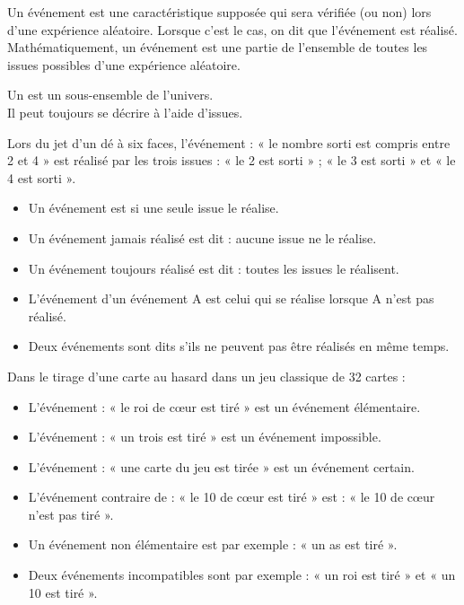 Un événement est une caractéristique supposée qui sera vérifiée (ou non) lors d'une expérience aléatoire. Lorsque c'est le cas, on dit que l'événement est réalisé. \\
Mathématiquement, un événement est une partie de l'ensemble de toutes les issues possibles d'une expérience aléatoire.

\begin{definition}[Événement]
Un  est un sous-ensemble de l'univers.\\
Il peut toujours se décrire à l'aide d'issues.  
\end{definition}

\begin{exemple*1}
Lors du jet d'un dé à six faces, l'événement : « le nombre sorti est compris entre 2 et 4 » est réalisé par les trois issues : « le 2 est sorti » ; « le 3 est sorti » et « le 4 est sorti ».
\end{exemple*1}


\begin{definition}
\begin{itemize}
\item Un événement est  si une seule issue le réalise.
\item Un événement jamais réalisé est dit  : aucune issue ne le réalise.
\item Un événement toujours réalisé est dit  : toutes les issues le réalisent.
\item L'événement  d'un événement A est celui qui se réalise lorsque A n'est pas réalisé.
\item Deux événements sont dits  s'ils ne peuvent pas être réalisés en même temps.
\end{itemize}
\end{definition}

\begin{exemple*1}
Dans le tirage d'une carte au hasard dans un jeu classique de 32 cartes :
\begin{itemize}
	\item  L'événement : « le roi de cœur est tiré » est un événement élémentaire.
	\item L'événement : « un trois est tiré » est un événement impossible.
	\item  L'événement : « une carte du jeu est tirée » est un événement certain.
	\item L'événement contraire de : « le 10 de cœur est tiré » est : « le 10 de cœur n'est pas tiré ».
	\item Un événement non élémentaire est par exemple : « un as est tiré ».
	\item Deux événements incompatibles sont par exemple : « un roi est tiré » et « un 10 est tiré ».
\end{itemize}
\end{exemple*1}


